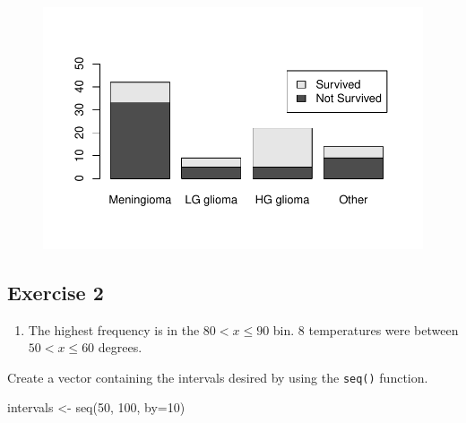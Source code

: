 \documentclass[
  letterpaper,
  DIV=11,
  numbers=noendperiod]{scrreprt}
\newenvironment{Shaded}{\begin{snugshade}}{\end{snugshade}}
\newcommand{\AttributeTok}[1]{\textcolor[rgb]{0.40,0.45,0.13}{#1}}
\newcommand{\DecValTok}[1]{\textcolor[rgb]{0.68,0.00,0.00}{#1}}
\newcommand{\FunctionTok}[1]{\textcolor[rgb]{0.28,0.35,0.67}{#1}}
\newcommand{\NormalTok}[1]{\textcolor[rgb]{0.00,0.23,0.31}{#1}}
\newcommand{\OtherTok}[1]{\textcolor[rgb]{0.00,0.23,0.31}{#1}}
\providecommand{\tightlist}{%
  \setlength{\itemsep}{0pt}\setlength{\parskip}{0pt}}\usepackage{longtable,booktabs,array}
\begin{document}
\begin{figure}[H]

{\centering \includegraphics{./03-DescriptiveII_files/figure-pdf/unnamed-chunk-6-1.pdf}

}

\end{figure}

\hypertarget{exercise-2-3}{%
\subsection*{Exercise 2}\label{exercise-2-3}}

\begin{blackbox}

\begin{enumerate}
\def\labelenumi{\arabic{enumi}.}
\tightlist
\item
  The highest frequency is in the \(80 < x ≤ 90\) bin. \(8\)
  temperatures were between \(50 < x ≤ 60\) degrees.
\end{enumerate}

\end{blackbox}

Create a vector containing the intervals desired by using the
\texttt{seq()} function.

\begin{Shaded}
\begin{Highlighting}[numbers=left,,]
\NormalTok{intervals }\OtherTok{\textless{}{-}} \FunctionTok{seq}\NormalTok{(}\DecValTok{50}\NormalTok{, }\DecValTok{100}\NormalTok{, }\AttributeTok{by=}\DecValTok{10}\NormalTok{)}
\end{Highlighting}
\end{Shaded}
\end{document}
